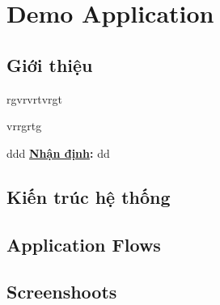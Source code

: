 \chapter{Demo Application}

\section{Giới thiệu}

rgvrvrtvrgt \par
vrrgrtg \par

ddd \textbf{\underline{Nhận định}:} dd

\section{Kiến trúc hệ thống}

\section{Application Flows}

\section{Screenshoots}